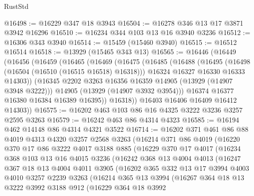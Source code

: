 \begin{lexlean}{RustStd}
\begin{coremodule}
@16498 := @16229 @347 @18 @3943
@16504 := @16278 @346 @13 @17 @3871 @3942 @16296
@16510 := @16234 @344 @103 @13 @16 @3940 @3236
@16512 := @16306 @343 @3940
@16514 := @15459 (@15460 @3940)
@16515 := @16512 @16514
@16518 := @13929 (@15465 @343 @13)
@16565 := @16446
    (@16449
      (@16456
        (@16459
          (@16465
            (@16469
              (@16475
                (@16485
                  (@16488
                    (@16495
                      (@16498 (@16504 (@16510 (@16515 @16518) @16318)))
                      @16324
                      @16327
                      @16330
                      @16333
                      @14303))
                  (@16345 @2202 @3263 @16356 @16359 @14905 (@13929 (@14907 @3948 @3222)))
                  @14905
                  (@13929 (@14907 @3932 @3954)))
                @16374
                @16377
                @16380
                @16384
                @16389
                @16395))
            @16318))
        @16403
        @16406
        @16409
        @16412
        @14303))
@16575 := @16202 @463 @103 @86 @16 @4325 @3222 @3236 @3257 @2595 @3263
@16579 := @16242 @463 @86 @4314 @4323
@16585 := @16194 @462 @14148 @86 @4314 @4321 @3522
@16714 := @16202
    @371
    @461
    @86
    @88
    @4019
    @4313
    @4320
    @3257
    @2568
    @3263
    (@16214
      @371
      @86
      @4019
      (@16220
        @370
        @17
        @86
        @3222
        @4017
        @3188
        @885
        (@16229
          @370
          @17
          @4017
          (@16234
            @368
            @103
            @13
            @16
            @4015
            @3236
            (@16242
              @368
              @13
              @4004
              @4013
              (@16247
                @367
                @18
                @13
                @4004
                @4011
                @3905
                (@16202
                  @365
                  @332
                  @13
                  @17
                  @3994
                  @4003
                  @4010
                  @3257
                  @2239
                  @3263
                  (@16214
                    @365
                    @13
                    @3994
                    (@16267
                      @364
                      @18
                      @13
                      @3222
                      @3992
                      @3188
                      @912
                      (@16229
                        @364
                        @18
                        @3992

\end{coremodule}
\end{lexlean}
